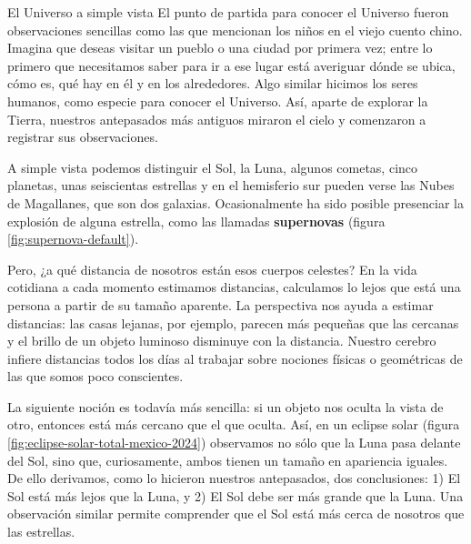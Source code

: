 \documentclass[12pt,addpoints,answers]{guia}
\begin{document}
\begin{sectionbox}{El Universo a simple vista}
    El punto de partida para conocer el Universo fueron observaciones sencillas como las que mencionan los niños en el viejo
    cuento chino. Imagina que deseas visitar un pueblo o una ciudad por primera vez; entre
    lo primero que necesitamos saber para ir a ese lugar está averiguar dónde se ubica, cómo
    es, qué hay en él y en los alrededores. Algo similar hicimos los seres humanos, como especie para conocer el Universo. Así, aparte de explorar la Tierra, nuestros antepasados
    más antiguos miraron el cielo y comenzaron a registrar sus observaciones.



    A simple vista podemos distinguir el Sol, la Luna, algunos cometas, cinco planetas,
    unas seiscientas estrellas y en el hemisferio sur pueden verse las Nubes de Magallanes,
    que son dos galaxias. Ocasionalmente ha sido posible presenciar la explosión de alguna estrella, como las llamadas \textbf{supernovas} (figura \ref{fig:supernova-default}).



    Pero, ¿a qué distancia de nosotros están esos cuerpos
    celestes? En la vida cotidiana a cada momento estimamos distancias, calculamos lo lejos que está una persona
    a partir de su tamaño aparente. La perspectiva nos ayuda a estimar distancias: las casas lejanas, por ejemplo,
    parecen más pequeñas que las cercanas y el brillo de un
    objeto luminoso disminuye con la distancia. Nuestro cerebro infiere distancias todos los días al trabajar sobre
    nociones físicas o geométricas de las que somos poco
    conscientes.



    La siguiente noción es todavía más sencilla: si un objeto nos oculta la vista de otro, entonces está más cercano que el que oculta. Así, en un eclipse solar (figura \ref{fig:eclipse-solar-total-mexico-2024}) observamos no sólo que
    la Luna pasa delante del Sol, sino que, curiosamente, ambos tienen un tamaño en
    apariencia iguales. De ello derivamos, como lo hicieron nuestros antepasados, dos
    conclusiones: 1) El Sol está más lejos que la Luna, y 2) El Sol debe ser más grande que
    la Luna. Una observación similar permite comprender que el Sol está más cerca de
    nosotros que las estrellas.


\end{sectionbox}
\end{document}

